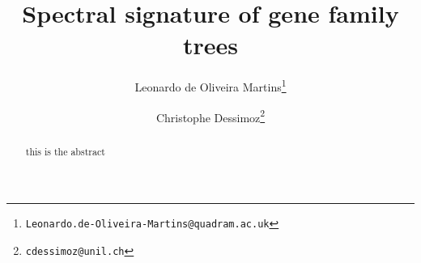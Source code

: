 \documentclass[pdftex,12pt,a4paper,openany,fleqn]{article}
\title{Spectral signature of gene family trees}
\author[1]{Leonardo de Oliveira Martins\thanks{{\tt Leonardo.de-Oliveira-Martins@quadram.ac.uk}}}
\author[2,3]{Christophe Dessimoz\thanks{{\tt cdessimoz@unil.ch}}}
\affil[1]{Quadram Institute Biosciences, Norwich, NR4 7UQ, UK}
\affil[2]{UNIL}
\affil[3]{UCL}
\date{\vspace{-5ex}}
\begin{document}
\maketitle

\begin{abstract}
this is the abstract
\end{abstract}





\begin{spacing}{0.8}  \end{spacing}
\end{document}
